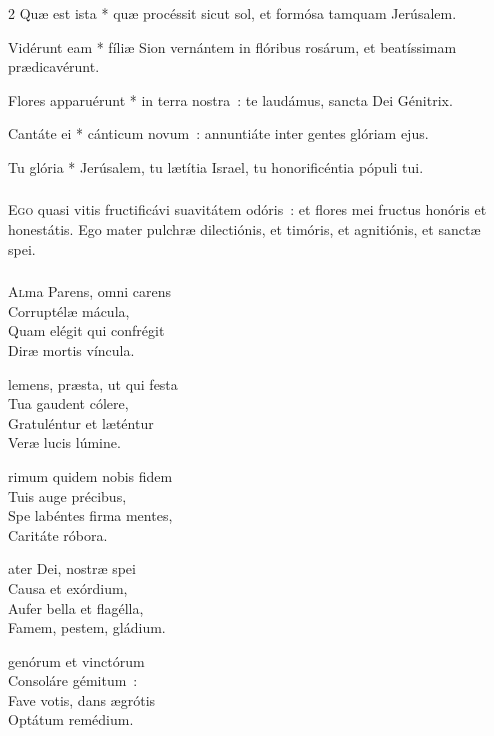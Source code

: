 \documentclass[9pt,twoside]{extarticle}
\begin{document}
\begin{multicols}{2}
\smallskip
{} Quæ est ista * quæ procéssit sicut sol, et formósa tamquam Jerúsalem.

{\small {}}

 Vidérunt eam * fíliæ Sion vernántem in flóribus rosárum, et beatíssimam prædicavérunt.

 Flores apparuérunt * in terra nostra~: te laudámus, sancta Dei Génitrix.

 Cantáte ei * cánticum novum~: annuntiáte inter gentes glóriam ejus.

 Tu glória * Jerúsalem, tu lætítia Israel, tu honorificéntia pópuli tui.

\subsubsection*{\center \normalfont {}}
\lettrine{E}{go} quasi vitis fructificávi suavitátem odóris~: et flores mei fructus honóris et honestátis. Ego mater pulchræ dilectiónis, et timóris, et agnitiónis, et sanctæ spei.

\subsubsection*{\center \normalfont {}}
\lettrine{A}{l}ma Parens, omni carens\\
Corruptélæ mácula,\\
Quam elégit qui confrégit\\
Diræ mortis víncula.

\smallskip
\noindent {}lemens, præsta, ut qui festa\\
Tua gaudent cólere,\\
Gratuléntur et læténtur\\
Veræ lucis lúmine.

\smallskip
\noindent {}rimum quidem nobis fidem\\
Tuis auge précibus,\\
Spe labéntes firma mentes,\\
Caritáte róbora.

\smallskip
\noindent {}ater Dei, nostræ spei\\
Causa et exórdium,\\
Aufer bella et flagélla,\\
Famem, pestem, gládium.

\smallskip
\noindent {}genórum et vinctórum\\
Consoláre gémitum~:\\
Fave votis, dans ægrótis\\
Optátum remédium.


\end{multicols}
\end{document}
